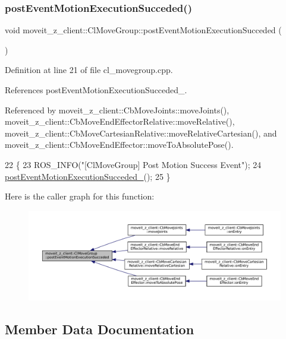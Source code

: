 \subsubsection{\texorpdfstring{post\+Event\+Motion\+Execution\+Succeded()}{postEventMotionExecutionSucceded()}}
{\footnotesize\ttfamily void moveit\+\_\+z\+\_\+client\+::\+Cl\+Move\+Group\+::post\+Event\+Motion\+Execution\+Succeded (\begin{DoxyParamCaption}{ }\end{DoxyParamCaption})}



Definition at line 21 of file cl\+\_\+movegroup.\+cpp.



References post\+Event\+Motion\+Execution\+Succeded\+\_\+.



Referenced by moveit\+\_\+z\+\_\+client\+::\+Cb\+Move\+Joints\+::move\+Joints(), moveit\+\_\+z\+\_\+client\+::\+Cb\+Move\+End\+Effector\+Relative\+::move\+Relative(), moveit\+\_\+z\+\_\+client\+::\+Cb\+Move\+Cartesian\+Relative\+::move\+Relative\+Cartesian(), and moveit\+\_\+z\+\_\+client\+::\+Cb\+Move\+End\+Effector\+::move\+To\+Absolute\+Pose().


\begin{DoxyCode}
22 \{
23     ROS\_INFO(\textcolor{stringliteral}{"[ClMoveGroup] Post Motion Success Event"});
24     \hyperlink{classmoveit__z__client_1_1ClMoveGroup_a9234c0edadb1f173c31fc8fa5430afcd}{postEventMotionExecutionSucceded\_}();
25 \}
\end{DoxyCode}
Here is the caller graph for this function\+:
\nopagebreak
\begin{figure}[H]
\begin{center}
\leavevmode
\includegraphics[width=350pt]{classmoveit__z__client_1_1ClMoveGroup_ad6b8f0acbe3d11b5c39a83911a3d95b8_icgraph}
\end{center}
\end{figure}


\subsection{Member Data Documentation}
\mbox{\label{classmoveit__z__client_1_1ClMoveGroup_af86e046b837be0ef4afa9893d8808f20}} 
